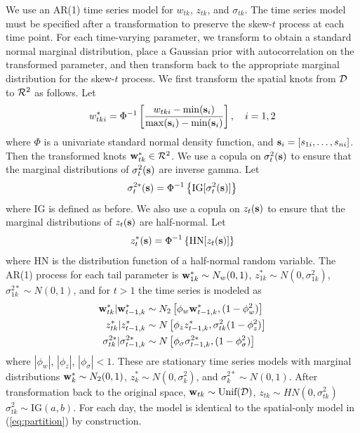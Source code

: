 \documentclass[11pt]{article}
\begin{document}
We use an AR(1) time series model for $w_{tk}$, $z_{tk}$, and $\sigma_{tk}$.
The time series model must be specified after a transformation to preserve the skew-$t$ process at each time point.
For each time-varying parameter, we transform to obtain a standard normal marginal distribution, place a Gaussian prior with autocorrelation on the transformed parameter, and then transform back to the appropriate marginal distribution for the skew-$t$ process.
We first transform the spatial knots from ${\cal D}$ to ${\cal R}^2$ as follows.
Let
\begin{align}
  w^*_{tki} = \Phi^{-1}\left[ \frac{ w_{tki} - \min(\mbox{\bf s}_i)}{ \max(\mbox{\bf s}_i) - \min(\mbox{\bf s}_i) } \right], \quad i = 1, 2
\end{align}
where $\Phi$ is a univariate standard normal density function, and $\mbox{\bf s}_i = [s_{1i}, \ldots, s_{ni}]$.
Then the transformed knots $\mbox{\bf w}^*_{tk} \in {\cal R}^2$.
We use a copula on $\sigma^2_t(\mbox{\bf s})$ to ensure that the marginal distributions of $\sigma^2_t(\mbox{\bf s})$ are inverse gamma.
Let
\begin{align}
  \sigma^{2*}_t(\mbox{\bf s}) =\Phi^{-1}\left\{ \text{IG}[\sigma^2_t(\mbox{\bf s})] \right\}
\end{align}
where IG is defined as before.
We also use a copula on $z_{t}(\mbox{\bf s})$ to ensure that the marginal distributions of $z_t(\mbox{\bf s})$ are half-normal.
Let
\begin{align}
  z^*_t(\mbox{\bf s}) = \Phi^{-1}\left\{ \text{HN}[z_t(\mbox{\bf s})] \right\}
\end{align}
where HN is the distribution function of a half-normal random variable.
The AR(1) process for each tail parameter is $\mbox{\bf w}^*_{1k} \sim N_w(0, 1)$, $z^*_{1k} \sim N(0, \sigma^2_{1k})$, $\sigma^{2*}_{1k} \sim N(0, 1)$, and for $t > 1$ the time series is modeled as
\begin{align}
  \mbox{\bf w}^*_{tk} | \mbox{\bf w}^*_{t-1, k} &\sim N_2\left[\phi_w \mbox{\bf w}^*_{t-1, k}, (1 - \phi_w^2) \right] \\
  z^*_{tk} | z^*_{t-1, k} &\sim N \left[\phi_z z^*_{t-1, k}, \sigma^2_{tk} (1 - \phi_z^2)\right] \\
  \sigma^{2*}_{tk} | \sigma^{2*}_{t-1, k} &\sim N \left[\phi_\sigma \sigma^{2*}_{t-1, k}, (1 - \phi_\sigma^2) \right]
\end{align}
where $|\phi_w|$, $|\phi_z|$, $|\phi_\sigma| < 1$.
These are stationary time series models with marginal distributions \hbox{$\mbox{\bf w}^*_{k} \sim N_2(0, 1)$}, \hbox{$z^*_{k} \sim N(0, \sigma^2_{k})$}, and \hbox{$\sigma^{2*}_{k} \sim N(0, 1)$}.
After transformation back to the original space, $\mbox{\bf w}_{tk} \sim \text{Unif}({\cal D})$, $z_{tk} \sim HN(0, \sigma^2_{tk})$ $\sigma^2_{tk} \sim \text{IG}(a, b)$.
For each day, the model is identical to the spatial-only model in (\ref{eq:partition}) by construction.
\end{document}
